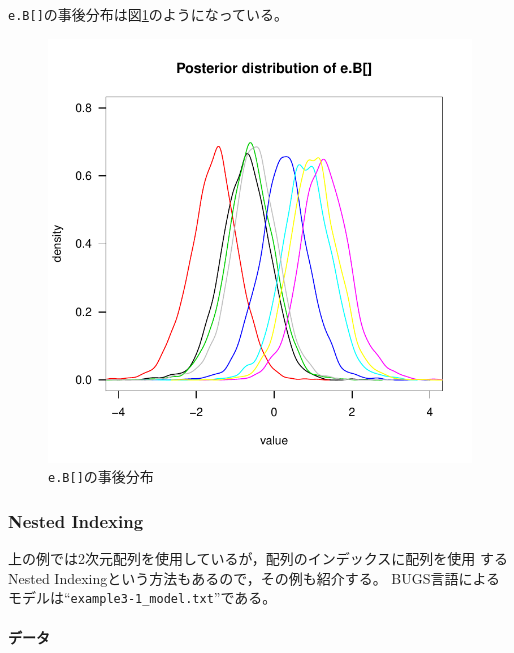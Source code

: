 \documentclass[11pt,uplatex]{jsarticle}
\begin{document}
\texttt{e.B[]}の事後分布は図\ref{example3_e_plot}のようになっている。


\begin{figure}[htbp]
	\begin{center}
		\includegraphics[bb=0 0 360 360, clip, width=270 bp]{example3_e.pdf}
	\end{center}
	\caption{\texttt{e.B[]}の事後分布}
	\label{example3_e_plot}
\end{figure}


\subsubsection*{Nested Indexing}
上の例では2次元配列を使用しているが，配列のインデックスに配列を使用
するNested Indexingという方法もあるので，その例も紹介する。
BUGS言語によるモデルは``\texttt{example3-1\_model.txt}''である。

\paragraph{データ}
\end{document}
